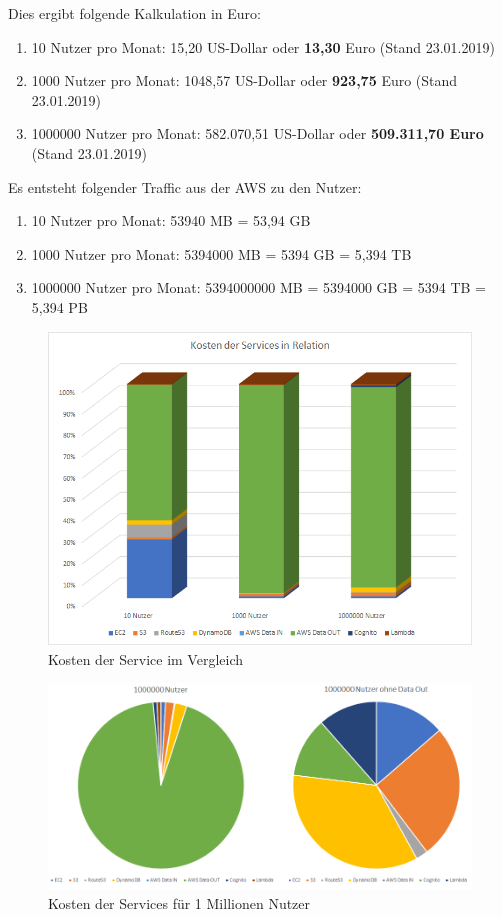\documentclass[a4paper, 12pt]{scrreprt}
\renewcommand\_{\textunderscore\allowbreak}
\begin{document}
Dies ergibt folgende Kalkulation in Euro:
\begin{enumerate}
	\item 10 Nutzer pro Monat: 15,20 US-Dollar oder \textbf{13,30} Euro (Stand 23.01.2019)
	\item 1000 Nutzer pro Monat: 1048,57 US-Dollar oder \textbf{923,75} Euro (Stand 23.01.2019)
	\item 1000000 Nutzer pro Monat: 582.070,51 US-Dollar oder \textbf{509.311,70 Euro} (Stand 23.01.2019) 
\end{enumerate}

Es entsteht folgender Traffic aus der AWS zu den Nutzer:
\begin{enumerate}
	\item 10 Nutzer pro Monat: 53940 MB = 53,94 GB
	\item 1000 Nutzer pro Monat: 5394000 MB = 5394 GB = 5,394 TB
	\item 1000000 Nutzer pro Monat: 5394000000 MB = 5394000 GB = 5394 TB = 5,394 PB
\end{enumerate}
\begin{figure}[H]
\centering
\includegraphics[scale=0.8]{costs-overview.png}
\caption{Kosten der Service im Vergleich}
\end{figure}

\begin{figure}[H]
\centering
\includegraphics[scale=0.75]{million-costs.png}
\caption{Kosten der Services für 1 Millionen Nutzer}
\end{figure}
\end{document}
